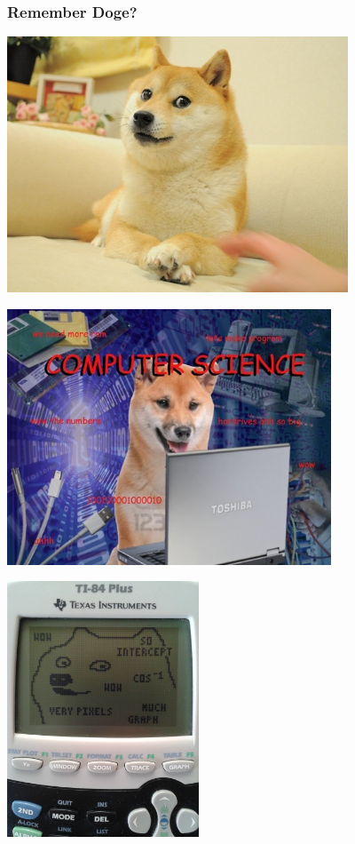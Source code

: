 \documentclass{beamer}
\begin{document}
\begin{frame}
  \frametitle{Remember Doge?}
  \includegraphics[height=3.0in]{doge}
\end{frame}

\begin{frame}
  \includegraphics[height=3.0in]{compsci_doge}
\end{frame}

\begin{frame}
  \includegraphics[height=3.0in]{calc_doge}
\end{frame}
\end{document}
